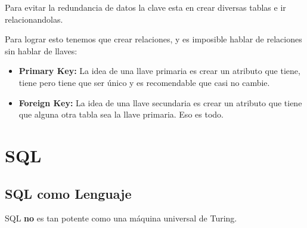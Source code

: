 \documentclass[12pt, fleqn]{report}                             %
\begin{document}
                Para evitar la redundancia de datos la clave esta en crear diversas tablas
                e ir relacionandolas.

                Para lograr esto tenemos que crear relaciones, y es imposible hablar de relaciones
                sin hablar de llaves:


                \begin{itemize}
                    \item
                        \textbf{Primary Key:}
                        La idea de una llave primaria es crear un atributo que tiene, tiene pero
                        tiene que ser único y es recomendable que casi no cambie.


                    \item
                        \textbf{Foreign Key:}
                        La idea de una llave secundaria es crear un atributo que tiene que alguna otra
                        tabla sea la llave primaria. Eso es todo.

                \end{itemize}


 










            
        





    \chapter{SQL}

        \clearpage
        \section{SQL como Lenguaje}
            
            SQL \textbf{no} es tan potente como una máquina universal de Turing.
\end{document}
